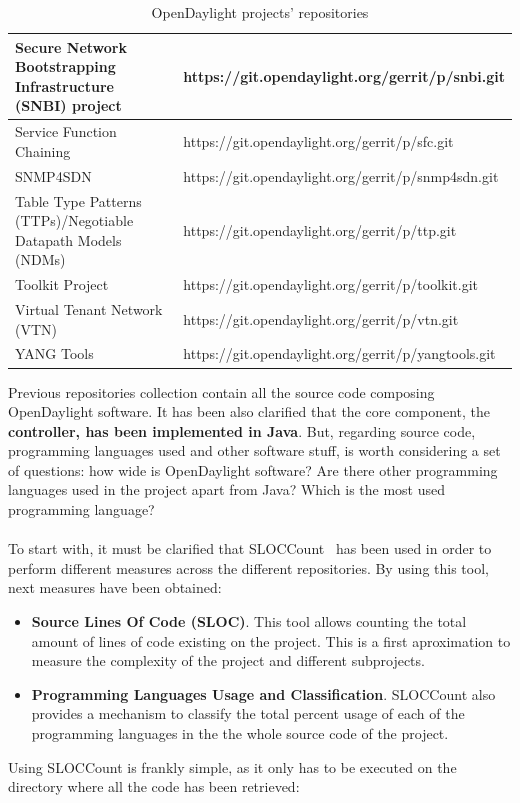 \documentclass[a4paper, 12pt]{book}
\begin{document}
\begin{table}[H]
\begin{center}
\begin{tabular}{|p{6cm}|l|}
Secure Network Bootstrapping Infrastructure (SNBI) project & https://git.opendaylight.org/gerrit/p/snbi.git \\ \hline
Service Function Chaining & https://git.opendaylight.org/gerrit/p/sfc.git \\ \hline
SNMP4SDN  & https://git.opendaylight.org/gerrit/p/snmp4sdn.git \\ \hline
Table Type Patterns (TTPs)/Negotiable Datapath Models (NDMs) & https://git.opendaylight.org/gerrit/p/ttp.git \\ \hline
Toolkit Project & https://git.opendaylight.org/gerrit/p/toolkit.git \\ \hline
Virtual Tenant Network (VTN) & https://git.opendaylight.org/gerrit/p/vtn.git \\ \hline
YANG Tools & https://git.opendaylight.org/gerrit/p/yangtools.git \\ \hline
\end{tabular}
\end{center}
\caption{OpenDaylight projects' repositories}
\label{tab:projectgitrepos}
\end{table}
Previous repositories collection contain all the source code composing OpenDaylight software. It has been also clarified that the core component, the \textbf{controller, has been implemented in Java}. But, regarding source code, programming languages used and other software stuff, is worth considering a set of questions: how wide is OpenDaylight software? Are there other programming languages used in the project apart from Java? Which is the most used programming language?\\
\\
To start with, it must be clarified that SLOCCount~\cite{SLOCCount} has been used in order to perform different measures across the different repositories. By using this tool, next measures have been obtained:
\begin{itemize}\itemsep0pt
\item{\textbf{Source Lines Of Code (SLOC)}}. This tool allows counting the total amount of lines of code existing on the project. This is a first aproximation to measure the complexity of the project and different subprojects.
\item{\textbf{Programming Languages Usage and Classification}}. SLOCCount also provides a mechanism to classify the total percent usage of each of the programming languages in the the whole source code of the project.
\end{itemize}
Using SLOCCount is frankly simple, as it only has to be executed on the directory where all the code has been retrieved:
\end{document}
